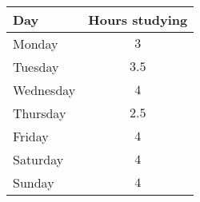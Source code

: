 \begin{tabular}{lc}         \toprule
Day       & Hours studying \\\midrule
Monday    & $3$            \\
Tuesday   & $3.5$          \\
Wednesday & $4$            \\
Thursday  & $2.5$          \\
Friday    & $4$            \\
Saturday  & $4$            \\
Sunday    & $4$            \\\bottomrule
\end{tabular}
